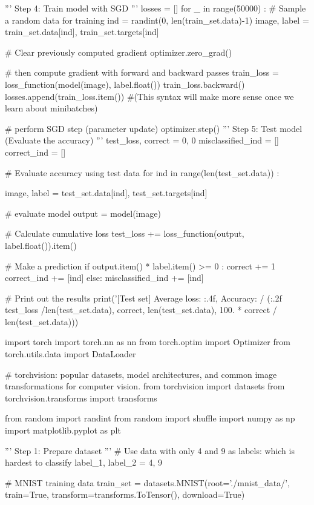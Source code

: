 \documentclass[10pt]{article}
\begin{document}
\begin{python}
'''
Step 4: Train model with SGD
'''
losses = []
for _ in range(50000) :
    # Sample a random data for training
    ind = randint(0, len(train_set.data)-1)
    image, label = train_set.data[ind], train_set.targets[ind]

    # Clear previously computed gradient
    optimizer.zero_grad()

    # then compute gradient with forward and backward passes
    train_loss = loss_function(model(image), label.float())
    train_loss.backward()
    losses.append(train_loss.item())
    #(This syntax will make more sense once we learn about minibatches)

    # perform SGD step (parameter update)
    optimizer.step()
'''
Step 5: Test model (Evaluate the accuracy)
'''
test_loss, correct = 0, 0
misclassified_ind = []
correct_ind = []

# Evaluate accuracy using test data
for ind in range(len(test_set.data)) :

    image, label = test_set.data[ind], test_set.targets[ind]

    # evaluate model
    output = model(image)

    # Calculate cumulative loss
    test_loss += loss_function(output, label.float()).item()

    # Make a prediction
    if output.item() * label.item() >= 0 :
        correct += 1
        correct_ind += [ind]
    else:
        misclassified_ind += [ind]

# Print out the results
print('[Test set] Average loss: {:.4f}, Accuracy: {}/{} ({:.2f}%
        test_loss /len(test_set.data), correct, len(test_set.data),
        100. * correct / len(test_set.data)))

import torch
import torch.nn as nn
from torch.optim import Optimizer
from torch.utils.data import DataLoader

# torchvision: popular datasets, model architectures, and common image transformations for computer vision.
from torchvision import datasets
from torchvision.transforms import transforms

from random import randint
from random import shuffle
import numpy as np
import matplotlib.pyplot as plt


'''
Step 1: Prepare dataset
'''
# Use data with only 4 and 9 as labels: which is hardest to classify
label_1, label_2 = 4, 9

# MNIST training data
train_set = datasets.MNIST(root='./mnist_data/', train=True, transform=transforms.ToTensor(), download=True)


\end{python}
\end{document}
